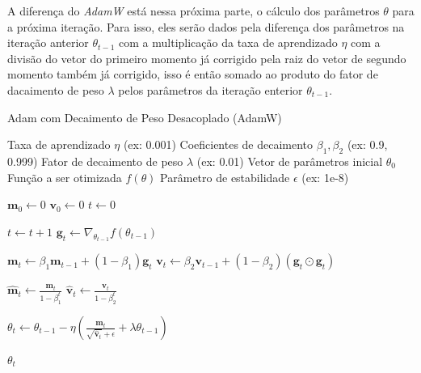 A diferença do \textit{AdamW} está nessa próxima parte, o cálculo dos parâmetros $\theta$ para a próxima iteração. Para isso, eles serão dados pela diferença dos parâmetros na iteração anterior $\theta_{t-1}$ com a multiplicação da taxa de aprendizado $\eta$ com a divisão do vetor do primeiro momento já corrigido pela raiz do vetor de segundo momento também já corrigido, isso é então somado ao produto do fator de dacaimento de peso $\lambda$ pelos parâmetros da iteração enterior $\theta_{t-1}$.

\begin{algorithm}[H]
    \caption{Adam com Decaimento de Peso Desacoplado (AdamW)}
    \label{alg:adamw}
    \begin{algorithmic}[1]

    \Require Taxa de aprendizado $\eta$ (ex: 0.001)
    \Require Coeficientes de decaimento $\beta_1, \beta_2$ (ex: 0.9, 0.999)
    \Require Fator de decaimento de peso $\lambda$ (ex: 0.01)
    \Require Vetor de parâmetros inicial $\theta_0$
    \Require Função a ser otimizada $f(\theta)$
    \Require Parâmetro de estabilidade $\epsilon$ (ex: 1e-8)

    \State $\mathbf{m}_0 \leftarrow 0$ 
    \State $\mathbf{v}_0 \leftarrow 0$ 
    \State $t \leftarrow 0$ 

        \State $t \leftarrow t + 1$
        \State $\mathbf{g}_t \leftarrow \nabla_{\theta_{t-1}} f(\theta_{t-1})$ 
        
        \State $\mathbf{m}_t \leftarrow \beta_1 \mathbf{m}_{t-1} + (1 - \beta_1) \mathbf{g}_t$
        \State $\mathbf{v}_t \leftarrow \beta_2 \mathbf{v}_{t-1} + (1 - \beta_2) (\mathbf{g}_t \odot \mathbf{g}_t)$
        
        \State $\mathbf{\hat{m}}_t \leftarrow \frac{\mathbf{m}_t}{1 - \beta_1^t}$
        \State $\mathbf{\hat{v}}_t \leftarrow \frac{\mathbf{v}_t}{1 - \beta_2^t}$
        
        \State $\theta_t \leftarrow \theta_{t-1} - \eta \left( \frac{\mathbf{\hat{m}}_t}{\sqrt{\mathbf{\hat{v}}_t} + \epsilon} + \lambda \theta_{t-1} \right)$
    \EndWhile

    \State \Return $\theta_t$ 
    \end{algorithmic}
\end{algorithm}

